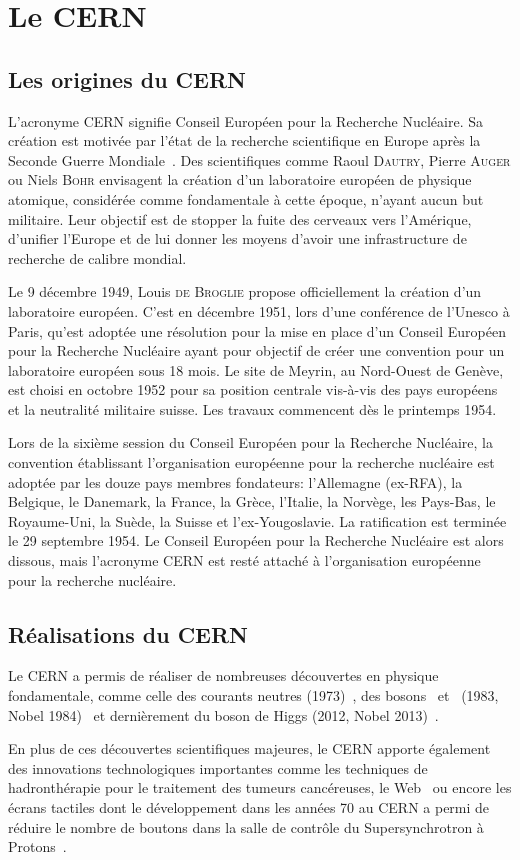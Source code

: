 \section{Le CERN}\label{chapter-LHC-section-CERN}
\subsection{Les origines du CERN}
L'acronyme \og CERN \fg{} signifie Conseil Européen pour la Recherche Nucléaire.
Sa création est motivée par l'état de la recherche scientifique en Europe après la Seconde Guerre Mondiale~\cite{CERN_website}.
Des scientifiques comme Raoul \textsc{Dautry}, Pierre \textsc{Auger} ou Niels \textsc{Bohr} envisagent la création d'un laboratoire européen de physique atomique,
considérée comme fondamentale à cette époque,
n'ayant aucun but militaire.
Leur objectif est de stopper la fuite des cerveaux vers l'Amérique, d'unifier l'Europe et de lui donner les moyens d'avoir une infrastructure de recherche de calibre mondial.
\par Le 9 décembre 1949, Louis \textsc{de Broglie} propose officiellement la création d'un laboratoire européen.
C'est en décembre 1951, lors d'une conférence de l'Unesco à Paris, qu'est adoptée une résolution pour la mise en place d'un Conseil Européen pour la Recherche Nucléaire ayant pour objectif de créer une convention pour un laboratoire européen sous 18 mois.
Le site de Meyrin, au Nord-Ouest de Genève, est choisi en octobre 1952 pour sa position centrale vis-à-vis des pays européens et la neutralité militaire suisse. Les travaux commencent dès le printemps 1954.
\par Lors de la sixième session du Conseil Européen pour la Recherche Nucléaire, la convention établissant l'organisation européenne pour la recherche nucléaire est adoptée par les douze pays membres fondateurs: l'Allemagne (ex-RFA), la Belgique, le Danemark, la France, la Grèce, l'Italie, la Norvège, les Pays-Bas, le Royaume-Uni, la Suède, la Suisse et l'ex-Yougoslavie.
La ratification est terminée le 29 septembre 1954.
Le Conseil Européen pour la Recherche Nucléaire est alors dissous, mais l'acronyme CERN est resté attaché à l'organisation européenne pour la recherche nucléaire.
\subsection{Réalisations du CERN}
Le CERN a permis de réaliser de nombreuses découvertes en physique fondamentale, comme
celle des courants neutres (1973)~\cite{Hasert:243640,HASERT1973138,Hasert:203096},
des bosons \Wboson\ et \Zboson\ (1983, Nobel 1984)~\cite{Wboson_discovery1,Wboson_discovery2,Wboson_discovery3,Zboson_discovery1,Zboson_discovery2}
et dernièrement du boson de Higgs (2012, Nobel 2013)~\cite{ATLAS_Higgs_discovery,CMS_Higgs_discovery}.
\par En plus de ces découvertes scientifiques majeures, le CERN apporte également des innovations technologiques importantes
comme
les techniques de hadronthérapie pour le traitement des tumeurs cancéreuses,
le Web~\cite{CERN_web}
ou encore
les écrans tactiles dont le développement dans les années 70 au CERN a permi de réduire le nombre de boutons dans la salle de contrôle du Supersynchrotron à Protons~\cite{CERN_touchscreen}.
